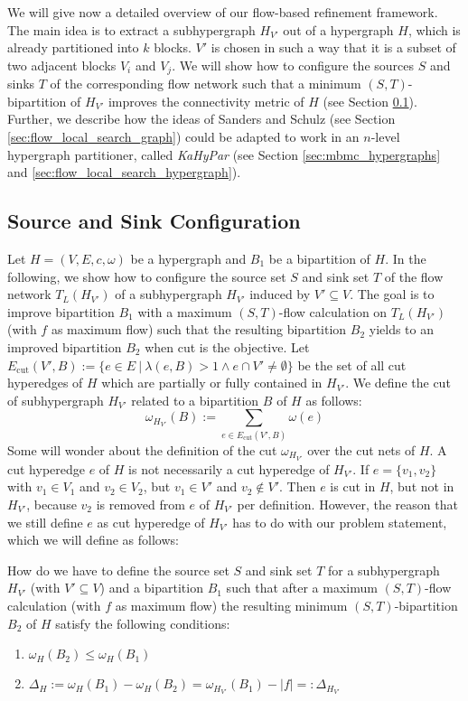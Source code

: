 We will give now a detailed overview of our flow-based refinement framework. The main
idea is to extract a subhypergraph $H_{V'}$ out of a hypergraph $H$, which is already
partitioned into $k$ blocks. $V'$ is chosen in such a way that it is a subset of two
adjacent blocks $V_i$ and $V_j$. We will show how to configure
the sources $S$ and sinks $T$ of the corresponding flow network such that
a minimum $(S,T)$-bipartition of $H_{V'}$ improves the connectivity metric of $H$
(see Section \ref{sec:source_and_sink}). Further, we describe how the ideas of
Sanders and Schulz \cite{sanders2011engineering} (see Section \ref{sec:flow_local_search_graph}) 
could be adapted to work in an $n$-level hypergraph partitioner, called \emph{KaHyPar}
(see Section \ref{sec:mbmc_hypergraphs} and \ref{sec:flow_local_search_hypergraph}). 

\subsection{Source and Sink Configuration}
\label{sec:source_and_sink}

Let $H = (V,E,c,\omega)$ be a hypergraph and $B_1$ be a bipartition of $H$.
In the following, we show how to configure the source set $S$ and sink set $T$ of the flow
network $T_L(H_{V'})$ of a subhypergraph $H_{V'}$ induced by $V' \subseteq V$. The goal is 
to improve bipartition $B_1$ with a maximum $(S,T)$-flow calculation 
on $T_L(H_{V'})$ (with $f$ as maximum flow) such that the resulting bipartition 
$B_2$ yields to an improved bipartition $B_2$ when cut is the objective.
Let $E_{\text{cut}}(V',B) := \{ e \in E\ |\ \lambda(e,B) > 1 \land e \cap V' \neq \emptyset\}$ 
be the set of all cut hyperedges of $H$ which are partially or fully contained in $H_{V'}$.
We define the cut of subhypergraph $H_{V'}$ related to a bipartition $B$ of $H$
as follows:
\[\omega_{H_{V'}}(B) := \sum_{e \in E_{\text{cut}}(V',B)} \omega(e) \]
Some will wonder about the definition of the cut $\omega_{H_{V'}}$ over the
cut nets of $H$. A cut hyperedge $e$ of $H$ is not necessarily a cut hyperedge
of $H_{V'}$. If $e = \{v_1,v_2\}$ with $v_1 \in V_1$ and $v_2 \in V_2$, but
$v_1 \in V'$ and $v_2 \notin V'$. Then $e$ is cut in $H$, but not in $H_{V'}$, because
$v_2$ is removed from $e$ of $H_{V'}$ per definition. However, the reason that we still
define $e$ as cut hyperedge of $H_{V'}$ has to do with our problem statement, 
which we will define as follows:

\begin{problem}
\label{prob:ST}
How do we have to define the source set $S$ and sink set $T$ for a subhypergraph $H_{V'}$ 
(with $V' \subseteq V$) and a bipartition $B_1$ such that 
after a maximum $(S,T)$-flow calculation (with $f$ as maximum flow)
the resulting minimum $(S,T)$-bipartition $B_2$ of $H$ satisfy the following conditions:
\begin{enumerate}
\item $\omega_H(B_2) \le \omega_H(B_1)$
\item $\Delta_{H} := \omega_H(B_1) - \omega_H(B_2) = \omega_{H_{V'}}(B_1) - |f| =: \Delta_{H_{V'}}$
\end{enumerate}
\end{problem}

